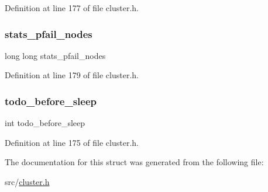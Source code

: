 Definition at line 177 of file cluster.\+h.

\mbox{\label{structcluster_state_a278d5ed382c852a1e40e985d642306e6}} 
\subsubsection{\texorpdfstring{stats\+\_\+pfail\+\_\+nodes}{stats\_pfail\_nodes}}
{\footnotesize\ttfamily long long stats\+\_\+pfail\+\_\+nodes}



Definition at line 179 of file cluster.\+h.

\mbox{\label{structcluster_state_ad1fa0188f945aac48dec9eb49c943a72}} 
\subsubsection{\texorpdfstring{todo\+\_\+before\+\_\+sleep}{todo\_before\_sleep}}
{\footnotesize\ttfamily int todo\+\_\+before\+\_\+sleep}



Definition at line 175 of file cluster.\+h.



The documentation for this struct was generated from the following file\+:\begin{DoxyCompactItemize}
\item 
src/\hyperlink{cluster_8h}{cluster.\+h}\end{DoxyCompactItemize}
